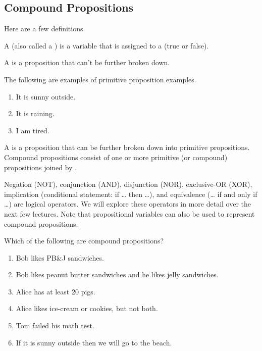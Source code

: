 \documentclass[../notes.tex]{subfiles}
\begin{document}
\subsection{Compound Propositions}
Here are a few definitions.
\begin{definition}
    A  (also called a ) is a variable that is assigned to a  (true or false). 
\end{definition}
\begin{definition}
    A  is a proposition that can't be further broken down. 
\end{definition}
\begin{example}
    The following are examples of primitive proposition examples.
    \begin{enumerate}[label=(\alph*)]
        \item It is sunny outside.
        \item It is raining.
        \item I am tired.
    \end{enumerate}
\end{example}
\begin{definition}
    A  is a proposition that can be further broken down into primitive propositions. Compound propositions consist of one or more primitive (or compound) propositions joined by .
\end{definition}
Negation (NOT), conjunction (AND), disjunction (NOR), exclusive-OR (XOR), implication (conditional statement: if \ldots{} then \ldots), and equivalence (\ldots{} if and only if \ldots) are logical operators. We will explore these operators in more detail over the next few lectures. Note that propositional variables can also be used to represent compound propositions.
\begin{exercise}
Which of the following are compound propositions? 
    \begin{enumerate}[label=(\alph*)]
        \item Bob likes PB\&J sandwiches. 
        \item Bob likes peanut butter sandwiches and he likes jelly sandwiches.
        \item Alice has at least $20$ pigs.
        \item Alice likes ice-cream or cookies, but not both. 
        \item Tom failed his math test. 
        \item If it is sunny outside then we will go to the beach. 
    \end{enumerate}
\end{exercise}
\end{document}
